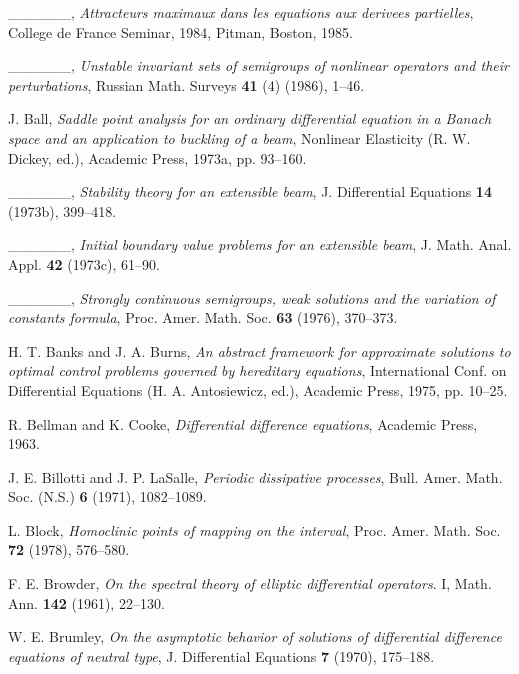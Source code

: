 \documentclass{surv-l}
\theoremstyle{plain}
\theoremstyle{definition}
\numberwithin{equation}{section}
\numberwithin{figure}{chapter}
\begin{document}
\begin{thebibliography}{}
 \_\_\_\_\_\_, \emph{Attracteurs maximaux dans les equations aux derivees partielles}, College de France Seminar, 1984, Pitman, Boston, 1985.

 \_\_\_\_\_\_, \emph{Unstable invariant sets of semigroups of nonlinear operators and their perturbations}, Russian Math. Surveys \textbf{41} (4) (1986), 1--46.

 J. Ball, \emph{Saddle point analysis for an ordinary differential equation in a Banach space and an application to buckling of a beam}, Nonlinear Elasticity (R. W. Dickey, ed.), Academic Press, 1973a, pp. 93--160.

 \_\_\_\_\_\_, \emph{Stability theory for an extensible beam}, J. Differential Equations \textbf{14} (1973b), 399--418.

 \_\_\_\_\_\_, \emph{Initial boundary value problems for an extensible beam}, J. Math. Anal. Appl. \textbf{42} (1973c), 61--90.

 \_\_\_\_\_\_, \emph{Strongly continuous semigroups, weak solutions and the variation of constants formula}, Proc. Amer. Math. Soc. \textbf{63} (1976), 370--373.

 H. T. Banks and J. A. Burns, \emph{An abstract framework for approximate solutions to optimal control problems governed by hereditary equations}, International Conf. on Differential Equations (H. A. Antosiewicz, ed.), Academic Press, 1975, pp. 10--25.

 R. Bellman and K. Cooke, \emph{Differential difference equations}, Academic Press, 1963.

 J. E. Billotti and J. P. LaSalle, \emph{Periodic dissipative processes}, Bull. Amer. Math. Soc. (N.S.) \textbf{6} (1971), 1082--1089.

 L. Block, \emph{Homoclinic points of mapping on the interval}, Proc. Amer. Math. Soc. \textbf{72} (1978), 576--580.

 F. E. Browder, \emph{On the spectral theory of elliptic differential operators}. I, Math. Ann. \textbf{142} (1961), 22--130.

 W. E. Brumley, \emph{On the asymptotic behavior of solutions of differential difference equations of neutral type}, J. Differential Equations \textbf{7} (1970), 175--188.


\end{thebibliography}
\end{document}
